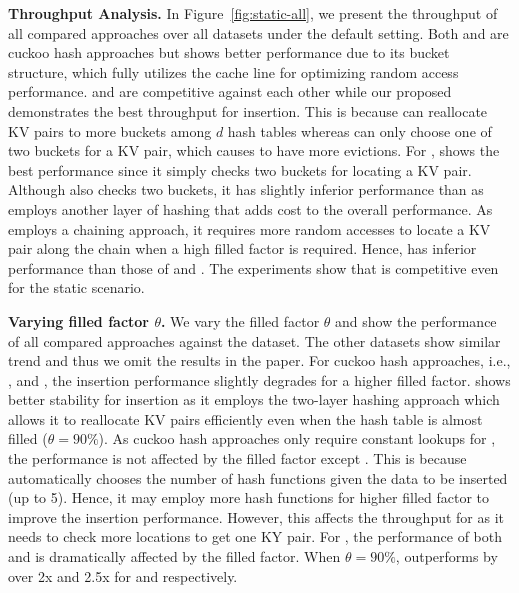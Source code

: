 \vspace{1mm}\noindent\textbf{Throughput Analysis.} In Figure~\ref{fig:static-all}, we present the throughput of all compared approaches over all datasets under the default setting.
Both \megakv and \cudpp are cuckoo hash approaches but \megakv shows better performance due to its bucket structure, which fully utilizes the cache line for optimizing random access performance.
\megakv and \slab are competitive against each other
while our proposed \voter demonstrates the best throughput for insertion. This is because \voter can reallocate KV pairs to more buckets among $d$ hash tables whereas \megakv can only choose one of two buckets for a KV pair, which causes \megakv to have more evictions. For , \megakv shows the best performance since it simply checks two buckets for locating a KV pair.
Although \voter also checks two buckets, it has slightly inferior performance than \megakv as \voter employs another layer of hashing that adds cost to the overall performance. 
As \slab employs a chaining approach, it requires more random accesses to locate a KV pair along the chain when a high filled factor is required. Hence, \slab has inferior performance than those of \megakv and \voter.
The experiments show that \voter is competitive even for the static scenario.

\vspace{1mm}\noindent\textbf{Varying filled factor $\theta$.}
We vary the filled factor $\theta$ and show the performance of all compared approaches against the \dsrandom dataset. The other datasets show similar trend and thus we omit the results in the paper.
For cuckoo hash approaches, i.e., \cudpp, \megakv and \voter, 
the insertion performance slightly degrades for a higher filled factor. \voter shows better stability for insertion as it employs the two-layer hashing approach which allows it to reallocate KV pairs efficiently even when the hash table is almost filled ($\theta=90\%$).
As cuckoo hash approaches only require constant lookups for , the performance is not affected by the filled factor except \cudpp.
This is because \cudpp automatically chooses the number of hash functions given the data to be inserted (up to 5). 
Hence, it may employ more hash functions for higher filled factor to improve the insertion performance. 
However, this affects the throughput for  as it needs to check more locations to get one KY pair.  
For \slab, the performance of both  and  is dramatically affected by the filled factor. When $\theta=90\%$, \voter outperforms \slab by over 2x and 2.5x for  and  respectively.


